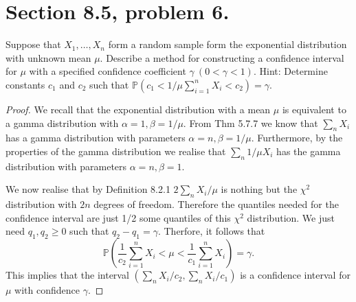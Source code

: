 \documentclass{article}
\renewcommand{\P}[1]{\mathbb{P}\left(#1\right)}
\newcommand{\randsamp}{X_1,\dots,X_n}
\newenvironment{hwproof}[1]
{
    #1
    \begin{proof}
}{
    \end{proof}
}
\begin{document}
\section{Section 8.5, problem 6.}
\begin{hwproof}
    {
        Suppose that $\randsamp$ form a random sample form the exponential
        distribution with unknown mean $\mu$. Describe a method for constructing
        a confidence interval for $\mu$ with a specified confidence coefficient
        $\gamma \ (0 < \gamma < 1).$ Hint: Determine constants $c_1$ and $c_2$
        such that $\P{c_1 < 1/\mu \sum_{i = 1}^n X_i < c_2} = \gamma$.
    }
    We recall that the exponential distribution with a mean $\mu$ is
    equivalent to a gamma distribution with $\alpha = 1, \beta = 1/\mu$.
    From Thm 5.7.7 we know that $\sum_n X_i$ has a gamma distribution with
    parameters $\alpha = n, \beta = 1/ \mu$. Furthermore, by the properties of the
    gamma distribution we realise that $\sum_n 1/\mu X_i$ has the gamma distribution
    with parameters $\alpha = n, \beta = 1$.

    We now realise that by Definition 8.2.1 $2\sum_n X_i/\mu$ is nothing but the
    $\chi^2$ distribution with $2n$ degrees of freedom. Therefore the quantiles
    needed for the confidence interval are just 1/2 some quantiles of this
    $\chi^2$ distribution. We just need $q_1, q_2 \geq 0$ such that
    $q_2 - q_1 = \gamma$. Therfore, it follows that
    \begin{equation*}
        \P{\frac{1}{c_2}\sum_{i=1}^n X_i < \mu < \frac{1}{c_1}\sum_{i=1}^n X_i} = \gamma.
    \end{equation*}
    This implies that the interval $\left(\sum_n X_i / c_2, \sum_n X_i / c_1 \right)$
    is a confidence interval for $\mu$ with confidence $\gamma$.
\end{hwproof}
\end{document}
